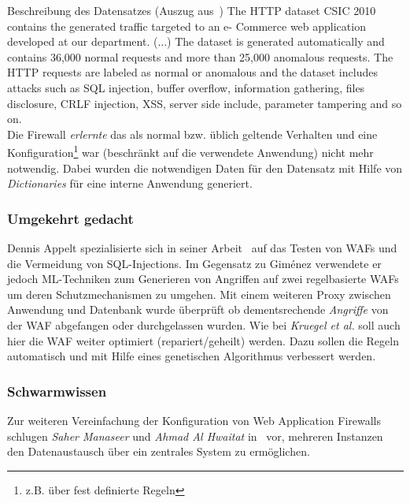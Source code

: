 \textcolor{bhtGray}{ Beschreibung des Datensatzes (Auszug aus~\cite{csic2010})} The HTTP dataset CSIC 2010 contains the generated traffic targeted to an e- Commerce web application developed at our department. (...) The dataset is generated automatically and contains 36,000 normal requests and more than 25,000 anomalous requests. The HTTP requests are labeled as normal or anomalous and the dataset includes attacks such as SQL injection, buffer overflow, information gathering, files disclosure, CRLF injection, XSS, server side include, parameter tampering and so on.\\

Die Firewall \emph{erlernte} das als normal bzw. üblich geltende Verhalten und eine Konfiguration\footnote{z.B. über fest definierte Regeln} war (beschränkt auf die verwendete Anwendung) nicht mehr notwendig. Dabei wurden die notwendigen Daten für den Datensatz mit Hilfe von \emph{Dictionaries} für eine interne Anwendung generiert. 


\subsubsection{Umgekehrt gedacht}

Dennis Appelt spezialisierte sich in seiner Arbeit~\cite{Appelt2016} auf das Testen von WAFs und die Vermeidung von SQL-Injections. Im Gegensatz zu Giménez verwendete er jedoch ML-Techniken zum Generieren von Angriffen auf zwei regelbasierte WAFs um deren Schutzmechanismen zu umgehen. Mit einem weiteren Proxy zwischen Anwendung und Datenbank wurde überprüft ob dementsrechende \emph{Angriffe} von der WAF abgefangen oder durchgelassen wurden. Wie bei \emph{Kruegel et al.} soll auch hier die WAF weiter optimiert (repariert/geheilt) werden. Dazu sollen die Regeln automatisch und mit Hilfe eines genetischen Algorithmus verbessert werden.

\subsubsection{Schwarmwissen}
Zur weiteren Vereinfachung der Konfiguration von Web Application Firewalls schlugen \emph{Saher Manaseer} und \emph{Ahmad Al Hwaitat} in~\cite{Manaseer2018} vor, mehreren Instanzen den Datenaustausch über ein zentrales System zu ermöglichen. 


